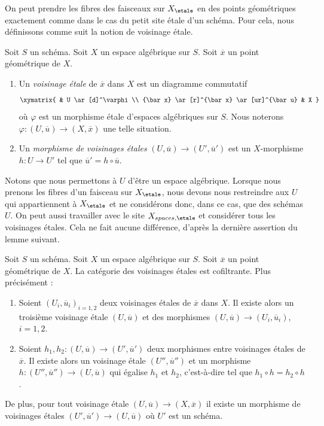 \noindent
On peut prendre les fibres des faisceaux sur $X_\etale$
en des points géométriques exactement comme dans le cas
du petit site \'etale d'un schéma. Pour cela, nous
définissons comme suit la notion de voisinage \'etale.

\begin{definition}
\label{definition-etale-neighbourhood}
Soit $S$ un schéma. Soit $X$ un espace algébrique sur $S$.
Soit $\overline{x}$ un point géométrique de $X$.
\begin{enumerate}
\item Un {\it voisinage \'etale} de $\overline{x}$
dans $X$ est un diagramme commutatif
$$
\xymatrix{
& U \ar[d]^\varphi \\
{\bar x} \ar[r]^{\bar x} \ar[ur]^{\bar u} & X
}
$$
où $\varphi$ est un morphisme \'etale d'espaces algébriques sur $S$.
Nous noterons $\varphi : (U, \overline{u}) \to (X, \overline{x})$
une telle situation.
\item Un {\it morphisme de voisinages \'etales}
$(U, \overline{u}) \to (U', \overline{u}')$
est un $X$-morphisme $h : U \to U'$
tel que $\overline{u}' = h \circ \overline{u}$.
\end{enumerate}
\end{definition}

\noindent
Notons que nous permettons à $U$ d'être un espace algébrique. Lorsque nous
prenons les fibres d'un faisceau sur $X_\etale$, nous devons nous restreindre aux $U$ qui
appartiennent à $X_\etale$ et ne considérons donc, dans ce cas,
que des schémas $U$. On peut aussi travailler avec le site
$X_{spaces, \etale}$ et considérer tous les voisinages \'etales. Cela
ne fait aucune différence, d'après la dernière assertion du lemme suivant.

\begin{lemma}
\label{lemma-cofinal-etale}
Soit $S$ un schéma. Soit $X$ un espace algébrique sur $S$.
Soit $\overline{x}$ un point géométrique de $X$.
La catégorie des voisinages \'etales est cofiltrante. Plus précisément :
\begin{enumerate}
\item Soient $(U_i, \overline{u}_i)_{i = 1, 2}$ deux voisinages \'etales de
$\overline{x}$ dans $X$. Il existe alors un troisième voisinage \'etale
$(U, \overline{u})$ et des morphismes
$(U, \overline{u}) \to (U_i, \overline{u}_i)$, $i = 1, 2$.
\item Soient $h_1, h_2: (U, \overline{u}) \to (U', \overline{u}')$ deux
morphismes entre voisinages \'etales de $\overline{x}$. Il existe alors un
voisinage \'etale $(U'', \overline{u}'')$ et un morphisme
$h : (U'', \overline{u}'') \to (U, \overline{u})$
qui égalise $h_1$ et $h_2$, c'est-à-dire tel que
$h_1 \circ h = h_2 \circ h$.
\end{enumerate}
De plus, pour tout voisinage \'etale
$(U, \overline{u}) \to (X, \overline{x})$
il existe un morphisme de voisinages \'etales
$(U', \overline{u}') \to (U, \overline{u})$
où $U'$ est un schéma.
\end{lemma}

